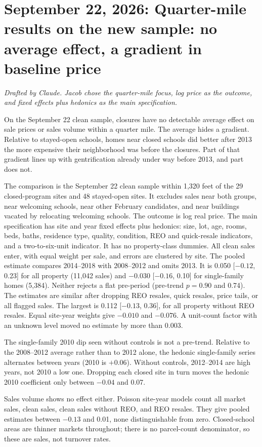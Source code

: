 \section*{September 22, 2026: Quarter-mile results on the new sample: no average effect, a gradient in baseline price}
\textit{Drafted by Claude. Jacob chose the quarter-mile focus, log price as the outcome, and fixed effects plus hedonics as the main specification.}

On the September 22 clean sample, closures have no detectable average effect on
sale prices or sales volume within a quarter mile. The average hides a gradient.
Relative to stayed-open schools, homes near closed schools did better after 2013
the more expensive their neighborhood was before the closures. Part of that gradient
lines up with gentrification already under way before 2013, and part does not.

The comparison is the September 22 clean sample within 1,320 feet of the 29
closed-program sites and 48 stayed-open sites. It excludes sales near both groups, near welcoming
schools, near other February candidates, and near buildings vacated by
relocating welcoming schools. The outcome is log real price. The main
specification has site and year fixed effects plus hedonics: size, lot, age,
rooms, beds, baths, residence type, quality, condition, REO and quick-resale
indicators, and a two-to-six-unit indicator. It has no property-class dummies.
All clean sales enter, with equal weight per sale, and errors are clustered by site. The pooled
estimate compares 2014--2018 with 2008--2012 and omits 2013. It is 0.050
[$-0.12$, 0.23] for all property (11,042 sales) and $-0.030$ [$-0.16$, 0.10] for
single-family homes (5,384). Neither rejects a flat pre-period (pre-trend
$p = 0.90$ and 0.74). The estimates are similar after dropping REO resales, quick
resales, price tails, or all flagged sales. The largest is 0.112 [$-0.13$, 0.36], for all
property without REO resales. Equal site-year weights give $-0.010$ and $-0.076$.
A unit-count factor with an unknown level moved no estimate by more than 0.003.

The single-family 2010 dip seen without controls is not a pre-trend. Relative to
the 2008--2012 average rather than to 2012 alone, the hedonic single-family series
alternates between years (2010 is $+0.06$). Without controls, 2012--2014 are high
years, not 2010 a low one. Dropping each closed site in turn moves the hedonic
2010 coefficient only between $-0.04$ and 0.07.

Sales volume shows no effect either. Poisson site-year models count all market sales,
clean sales, clean sales without REO, and REO resales. They give pooled estimates between $-0.13$ and
0.01, none distinguishable from zero. Closed-school areas are thinner markets throughout;
there is no parcel-count denominator, so these are sales, not turnover rates.

